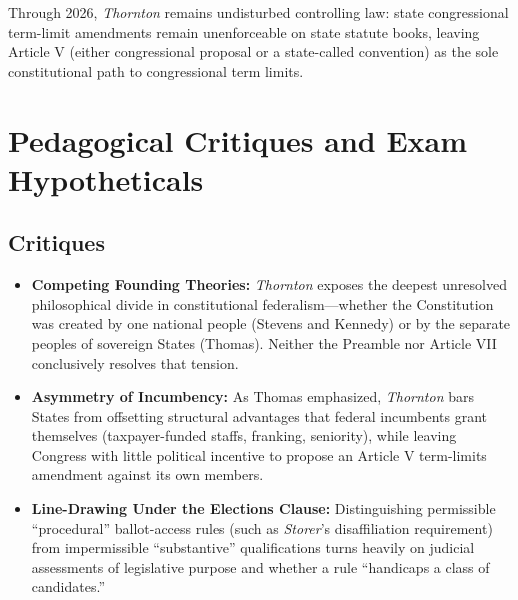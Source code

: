 \documentclass[12pt]{article}
\begin{document}
Through 2026, \textit{Thornton} remains undisturbed controlling law: state congressional term-limit amendments remain unenforceable on state statute books, leaving Article V (either congressional proposal or a state-called convention) as the sole constitutional path to congressional term limits.

\section{Pedagogical Critiques and Exam Hypotheticals}

\subsection{Critiques}
\begin{itemize}
    \item \textbf{Competing Founding Theories:} \textit{Thornton} exposes the deepest unresolved philosophical divide in constitutional federalism---whether the Constitution was created by one national people (Stevens and Kennedy) or by the separate peoples of sovereign States (Thomas). Neither the Preamble nor Article VII conclusively resolves that tension.
    \item \textbf{Asymmetry of Incumbency:} As Thomas emphasized, \textit{Thornton} bars States from offsetting structural advantages that federal incumbents grant themselves (taxpayer-funded staffs, franking, seniority), while leaving Congress with little political incentive to propose an Article V term-limits amendment against its own members.
    \item \textbf{Line-Drawing Under the Elections Clause:} Distinguishing permissible ``procedural'' ballot-access rules (such as \textit{Storer}'s disaffiliation requirement) from impermissible ``substantive'' qualifications turns heavily on judicial assessments of legislative purpose and whether a rule ``handicaps a class of candidates.''
\end{itemize}
\end{document}
